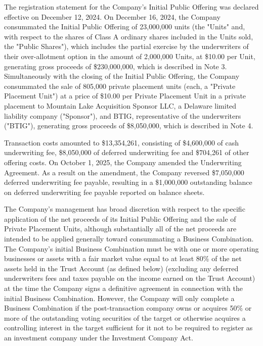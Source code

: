 \documentclass[11pt,a4paper]{article}
\begin{document}
The registration statement for the Company's Initial Public Offering was declared effective on December 12, 2024. On December 16, 2024, the Company consummated the Initial Public Offering of 23,000,000 units (the "Units" and, with respect to the shares of Class A ordinary shares included in the Units sold, the "Public Shares"), which includes the partial exercise by the underwriters of their over-allotment option in the amount of 2,000,000 Units, at \$10.00 per Unit, generating gross proceeds of \$230,000,000, which is described in Note 3. Simultaneously with the closing of the Initial Public Offering, the Company consummated the sale of 805,000 private placement units (each, a "Private Placement Unit") at a price of \$10.00 per Private Placement Unit in a private placement to Mountain Lake Acquisition Sponsor LLC, a Delaware limited liability company ("Sponsor"), and BTIG, representative of the underwriters ("BTIG"), generating gross proceeds of \$8,050,000, which is described in Note 4.

Transaction costs amounted to \$13,354,261, consisting of \$4,600,000 of cash underwriting fee, \$8,050,000 of deferred underwriting fee and \$704,261 of other offering costs. On October 1, 2025, the Company amended the Underwriting Agreement. As a result on the amendment, the Company reversed \$7,050,000 deferred underwriting fee payable, resulting in a \$1,000,000 outstanding balance on deferred underwriting fee payable reported on balance sheets.

The Company's management has broad discretion with respect to the specific application of the net proceeds of its Initial Public Offering and the sale of Private Placement Units, although substantially all of the net proceeds are intended to be applied generally toward consummating a Business Combination. The Company's initial Business Combination must be with one or more operating businesses or assets with a fair market value equal to at least 80\% of the net assets held in the Trust Account (as defined below) (excluding any deferred underwriters fees and taxes payable on the income earned on the Trust Account) at the time the Company signs a definitive agreement in connection with the initial Business Combination. However, the Company will only complete a Business Combination if the post-transaction company owns or acquires 50\% or more of the outstanding voting securities of the target or otherwise acquires a controlling interest in the target sufficient for it not to be required to register as an investment company under the Investment Company Act.
\end{document}
